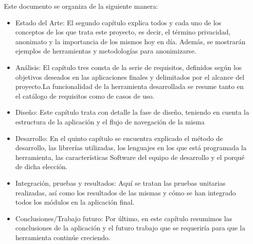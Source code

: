 Este documento se organiza de la siguiente manera:
\begin{itemize}
	\item Estado  del  Arte: El segundo capítulo explica todos y cada uno de los conceptos de los que trata este proyecto, es decir, el término privacidad, anonimato y la importancia de los mismos hoy en día. Además, se mostrarán ejemplos de herramientas y metodologías para anonimizarse. 
	\item Análisis: El capítulo tres consta de la serie de requisitos, definidos  según  los objetivos  deseados  en  las  aplicaciones  finales  y  delimitados  por  el  alcance  del proyecto.La funcionalidad de la herramienta desarrollada se resume tanto en el catálogo de requisitos como de casos de uso.
	\item Diseño: Este capítulo trata con detalle la fase de diseño, teniendo en cuenta la estructura de la aplicación y el flujo de navegación de la misma 
	\item Desarrollo: En el quinto capítulo se encuentra explicado el método de desarrollo, las librerías utilizadas, los lenguajes en los que está programada la herramienta, las características Software del equipo de desarrollo y el porqué de dicha elección.
	\item Integración, pruebas y resultados: Aquí se tratan las pruebas unitarias realizadas, así como los resultados de las mismas y cómo se han integrado todos los módulos en la aplicación final.
	\item Conclusiones/Trabajo  futuro: Por último, en este capítulo resumimos las conclusiones de la aplicación y el futuro trabajo que se requeriría para que la herramienta continúe creciendo.
\end{itemize}

\newpage \thispagestyle{empty} %